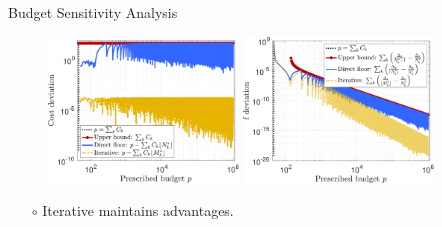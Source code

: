 \documentclass{beamer}
\begin{document}
\begin{frame}{Budget Sensitivity Analysis}
\begin{figure}
\centering
\includegraphics[width=0.45\textwidth]{./Figures/Eg2_Cost.pdf}
\includegraphics[width=0.45\textwidth]{./Figures/Eg2_f.pdf}
\end{figure}

{\footnotesize
\begin{itemize}[leftmargin=15pt] 
\item[$\circ$] Iterative maintains advantages.
\end{itemize}
}
\end{frame}


\end{document}
